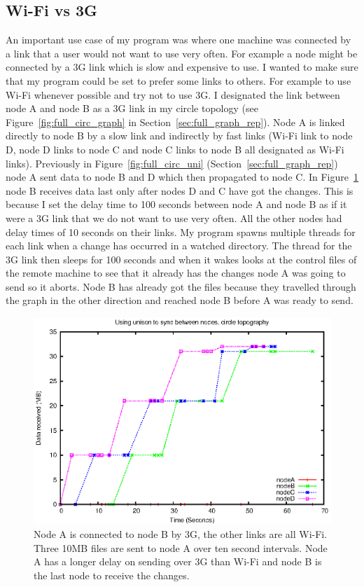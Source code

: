 \documentclass[12pt]{article}
\begin{document}
\subsection{Wi-Fi vs 3G}
An important use case of my program was where one machine was connected
by a link that a user would not want to use very
often. For example a node might be connected by a 3G link which is slow
and expensive to use. I wanted to make sure that my program could be set to prefer
some links to others. For example to use Wi-Fi whenever possible and try not to
use 3G. I designated the link between node A and node B as a 3G link
in my circle topology (see Figure~\ref{fig:full_circ_graph} in Section~\ref{sec:full_graph_rep}). Node A is linked directly to node B by a slow link and indirectly
by fast links (Wi-Fi link to node D, node D links to node C and node C links
to node B all designated as Wi-Fi links). Previously in Figure~\ref{fig:full_circ_uni} (Section~\ref{sec:full_graph_rep}) node A sent data to
node B and D which then propagated to node C.
In Figure~\ref{fig:circ_uni_thread_100} node B receives data last only after nodes D and C have got the changes.
This is because I set the delay time to 100 seconds between node A and node B
as if it were a 3G link that we do not want to use very often. All the other
nodes had delay times of 10 seconds on their links. My program
spawns multiple threads for each link when a change has occurred in a
watched directory. The thread for the 3G link then sleeps for 100 seconds
and when it wakes looks at the control files of the remote machine to
see that it already has the changes node A was going to send so it aborts.
Node B has already got the files because they travelled through the graph
in the other direction and reached node B before A was ready to send.

\begin{figure}[htp]
    \centering
    \includegraphics[height=0.5\textheight]{images/circ-uni-thread-100.eps}
    \caption{Node A is connected to node B by 3G, the other links are all Wi-Fi. Three 10MB files are sent to node A over ten second intervals. Node A has a longer delay on sending over 3G than Wi-Fi and node B is the last node to receive the changes.}
    \label{fig:circ_uni_thread_100}
\end{figure}
\end{document}
